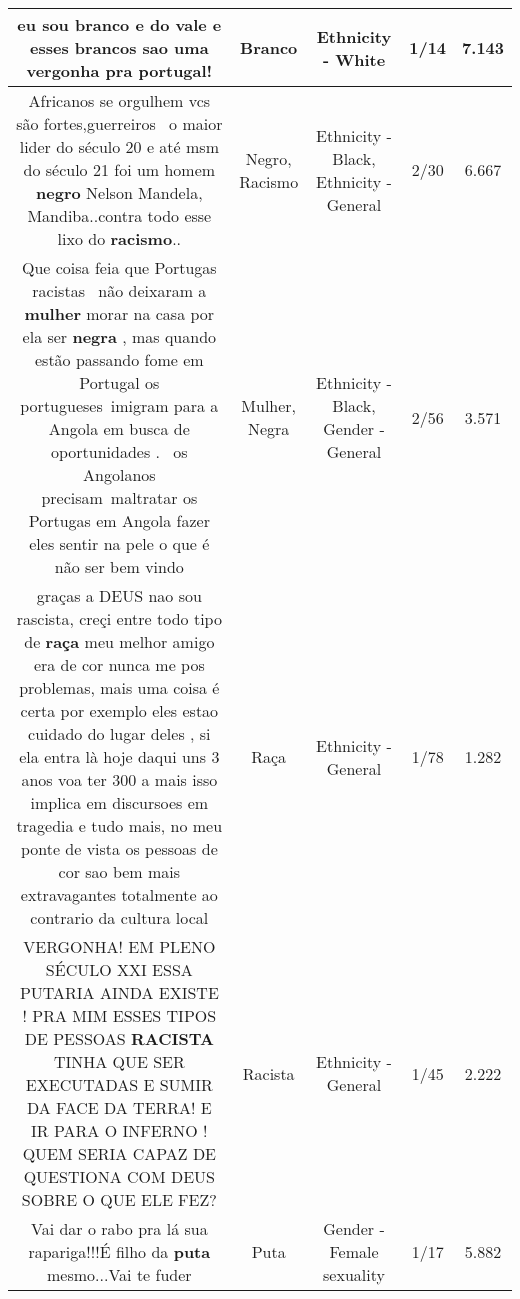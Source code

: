 \documentclass[11pt]{article}
\newlength\mylength
\begin{document}
\begin{center}
\begin{longtable}{|C{.65\mylength}|C{.30\mylength}|C{.12\mylength}|C{.12\mylength}|C{.12\mylength}|}
  \small eu sou \textbf{branco} e do vale e esses brancos sao uma vergonha pra portugal!\normalsize   & Branco & Ethnicity - White & 1/14 & 7.143 \\  \hline
  \small Africanos se orgulhem vcs são fortes,guerreiros  o maior lider do século 20 e até msm do século 21 foi um homem \textbf{negro} Nelson Mandela, Mandiba..contra todo esse lixo do \textbf{racismo}..\normalsize   & Negro, Racismo & Ethnicity - Black, Ethnicity - General & 2/30 & 6.667 \\  \hline
  \small Que coisa feia que Portugas racistas  não deixaram a \textbf{mulher} morar na casa por ela ser \textbf{negra} , mas quando estão passando fome em Portugal os portugueses imigram para a Angola em busca de oportunidades .  os Angolanos precisam maltratar os Portugas em Angola fazer eles sentir na pele o que é não ser bem vindo\normalsize   & Mulher, Negra & Ethnicity - Black, Gender - General & 2/56 & 3.571 \\  \hline
  \small graças a DEUS nao sou rascista, creçi entre todo tipo de \textbf{raça} meu melhor amigo era de cor nunca me pos problemas, mais uma coisa é certa por exemplo eles estao cuidado do lugar deles , si ela entra là hoje daqui uns 3 anos voa ter 300 a mais isso implica em discursoes em tragedia e tudo mais, no meu ponte de vista os pessoas de cor sao bem mais extravagantes totalmente ao contrario da cultura local\normalsize   & Raça & Ethnicity - General & 1/78 & 1.282 \\  \hline
  \small VERGONHA! EM PLENO SÉCULO XXI ESSA PUTARIA AINDA EXISTE ! PRA MIM ESSES TIPOS DE PESSOAS \textbf{RACISTA} TINHA QUE SER EXECUTADAS E SUMIR DA FACE DA TERRA! E IR PARA O INFERNO ! QUEM SERIA CAPAZ DE QUESTIONA COM DEUS SOBRE O QUE ELE FEZ?\normalsize   & Racista & Ethnicity - General & 1/45 & 2.222 \\  \hline
  \small Vai dar o rabo pra lá sua rapariga!!!É filho da \textbf{puta} mesmo...Vai te fuder   \normalsize   & Puta & Gender - Female sexuality & 1/17 & 5.882 \\  \hline

\end{longtable}
\end{center}
\end{document}
